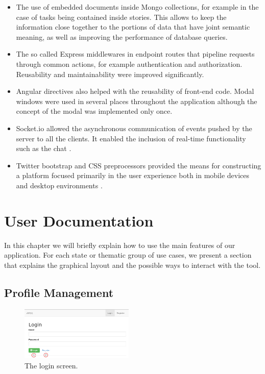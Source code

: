 \documentclass[
	accentcolor=tud1a %
]{tudreport}
\begin{document}
\begin{itemize}

\item The use of embedded documents inside Mongo collections, for example in the case of tasks being contained inside stories. This allows to keep the information close together to the portions of data that have joint semantic meaning, as well as improving the performance of database queries.

\item The so called Express middlewares in endpoint routes that pipeline requests through common actions, for example authentication and authorization. Reusability and maintainability were improved significantly.

\item Angular directives also helped with the reusability of front-end code. Modal windows were used in several places throughout the application although the concept of the modal was implemented only once.

\item Socket.io allowed the asynchronous communication of events pushed by the server to all the clients. It enabled the inclusion of real-time functionality such as the chat \cite{SIO}.

\item Twitter bootstrap and CSS preprocessors provided the means for constructing a platform focused primarily in the user experience both in mobile devices and desktop environments \cite{BOOT}.

\end{itemize}

\chapter{User Documentation}
\label{ch:use-documentation}

In this chapter we will briefly explain how to use the main features of our application. For each state or thematic group of use cases, we present a section that explains the graphical layout and the possible ways to interact with the tool.

\section{Profile Management}
\label{sec:profile-mgmt}

\begin{figure}
  	\centering
	\includegraphics[width=0.48\textwidth]{img/login}
	\caption{The login screen.}
	\label{fig:login}
\end{figure}
\end{document}
